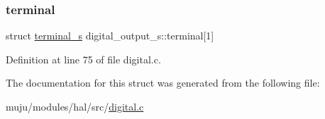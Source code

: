 \subsubsection{\texorpdfstring{terminal}{terminal}}
{\footnotesize\ttfamily struct \hyperlink{structterminal__s}{terminal\+\_\+s} digital\+\_\+output\+\_\+s\+::terminal\mbox{[}1\mbox{]}}



Definition at line 75 of file digital.\+c.



The documentation for this struct was generated from the following file\+:\begin{DoxyCompactItemize}
\item 
muju/modules/hal/src/\hyperlink{muju_2modules_2hal_2src_2digital_8c}{digital.\+c}\end{DoxyCompactItemize}
